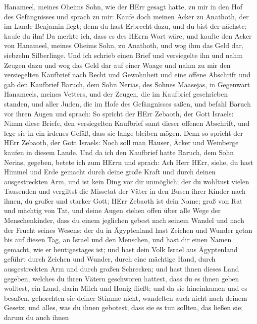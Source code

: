 Hanameel, meines Oheims Sohn, wie der HErr gesagt hatte, zu mir in den
Hof des Gefängnisses und sprach zu mir: Kaufe doch meinen Acker zu
Anathoth, der im Lande Benjamin liegt; denn du hast Erbrecht dazu, und
du bist der nächste; kaufe du ihn! Da merkte ich, dass es des HErrn Wort
wäre,  und kaufte den Acker von Hanameel, meines Oheims
Sohn, zu Anathoth, und wog ihm das Geld dar, siebzehn Silberlinge.
 Und ich schrieb einen Brief und versiegelte ihn und nahm
Zeugen dazu und wog das Geld dar auf einer Waage  und nahm
zu mir den versiegelten Kaufbrief nach Recht und Gewohnheit und eine
offene Abschrift  und gab den Kaufbrief Baruch, dem Sohn
Nerias, des Sohnes Maasejas, in Gegenwart Hanameels, meines Vetters, und
der Zeugen, die im Kaufbrief geschrieben standen, und aller Juden, die
im Hofe des Gefängnisses saßen,  und befahl Baruch vor
ihren Augen und sprach:  So spricht der HErr Zebaoth, der
Gott Israels: Nimm diese Briefe, den versiegelten Kaufbrief samt dieser
offenen Abschrift, und lege sie in ein irdenes Gefäß, dass sie lange
bleiben mögen.  Denn so spricht der HErr Zebaoth, der Gott
Israels: Noch soll man Häuser, Äcker und Weinberge kaufen in diesem
Lande.  Und da ich den Kaufbrief hatte Baruch, dem Sohn
Nerias, gegeben, betete ich zum HErrn und sprach:  Ach Herr
HErr, siehe, du hast Himmel und Erde gemacht durch deine große Kraft und
durch deinen ausgestreckten Arm, und ist kein Ding vor dir unmöglich;
 der du wohltust vielen Tausenden und vergiltst die
Missetat der Väter in den Busen ihrer Kinder nach ihnen, du großer und
starker Gott; HErr Zebaoth ist dein Name;  groß von Rat und
mächtig von Tat, und deine Augen stehen offen über alle Wege der
Menschenkinder, dass du einem jeglichen gebest nach seinem Wandel und
nach der Frucht seines Wesens;  der du in Ägyptenland hast
Zeichen und Wunder getan bis auf diesen Tag, an Israel und den Menschen,
und hast dir einen Namen gemacht, wie er heutigestages ist;
 und hast dein Volk Israel aus Ägyptenland geführt durch
Zeichen und Wunder, durch eine mächtige Hand, durch ausgestreckten Arm
und durch großen Schrecken;  und hast ihnen dieses Land
gegeben, welches du ihren Vätern geschworen hattest, dass du es ihnen
geben wolltest, ein Land, darin Milch und Honig fließt; 
und da sie hineinkamen und es besaßen, gehorchten sie deiner Stimme
nicht, wandelten auch nicht nach deinem Gesetz; und alles, was du ihnen
gebotest, dass sie es tun sollten, das ließen sie; darum du auch ihnen
